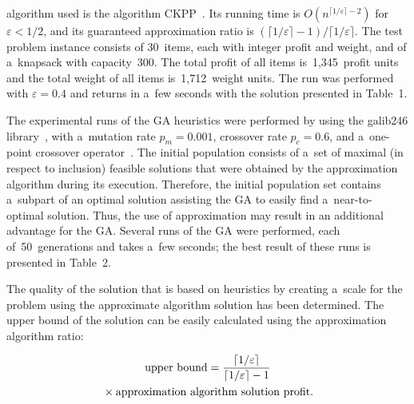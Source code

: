 \begin{multicols}{2}
\vspace*{6pt}

\addtocounter{table}{1}


\noindent
 algorithm used is the algorithm CKPP~\cite{KPP99}. Its running time is
$O\left(n^{\lceil1/\varepsilon\rceil-2}\right)$ for $\varepsilon < 1/2$, and
its guaranteed approximation ratio is
$\left({\lceil1/\varepsilon\rceil-1}\right)/{\lceil1/\varepsilon\rceil}$. The
test problem instance consists of 30~items, each with integer profit
and weight, and of a~knapsack with capacity~300. The total profit
of all items is~1,345~profit units and the total weight of all
items is~1,712~weight units. The run was performed with $\varepsilon
= 0.4$ and returns in a~few seconds with the solution presented in
Table~1.





The experimental runs of the GA heuristics were
performed by using the galib246 library~\cite{GAlib}, with a~mutation rate $p_{m} = 0.001$, crossover rate $p_{c} = 0.6$, and a~one-point crossover operator~\cite{link-to-the-sofware-cite}. The
initial population consists of a~set of maximal (in respect to
inclusion) feasible solutions that were obtained by the
approximation algorithm during its execution. Therefore, the initial
population set contains a~subpart of an optimal solution assisting
the GA to easily find a~near-to-optimal solution.
Thus, the use of approximation may result in an additional advantage
for the GA. Several runs of the GA
were performed, each of~50~generations and takes a~few seconds; the
best result of these runs is presented in Table~2.



 The quality of the solution that is based on
heuristics by creating a~scale for the problem using the approximate
algorithm solution has been determined. The upper bound of the
solution  can be easily calculated using the approximation algorithm ratio:

\vspace*{-5pt}

\noindent
\begin{multline*}
\mathrm{upper\ bound} =
\displaystyle\frac{\displaystyle \lceil1/\varepsilon\rceil\mathstrut}{\displaystyle \lceil1/\varepsilon\rceil-1\mathstrut}
\\
{}\times \mathrm{approximation\ algorithm\ solution\ profit}.
\end{multline*}

\vspace*{-5pt}


\end{multicols}
